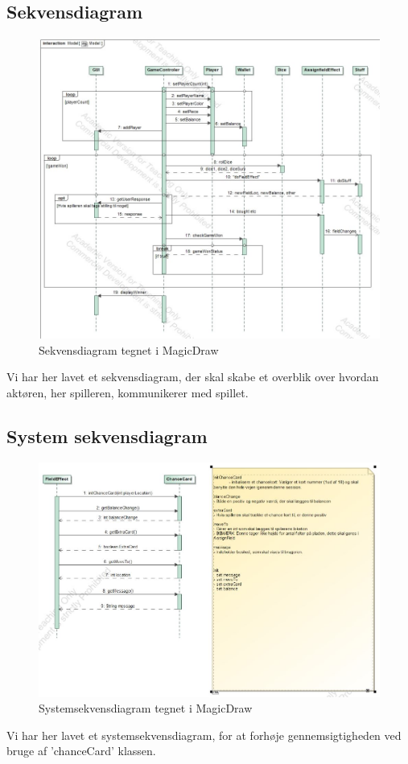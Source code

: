     \subsection{Sekvensdiagram}
        \begin{figure}[h]
            \advance\leftskip-3cm
            \includegraphics[width=18cm]{fig/Sekvensdiagram(1).jpg}
            \caption{Sekvensdiagram tegnet i MagicDraw}
        \end{figure} 
    Vi har her lavet et sekvensdiagram, der skal skabe et overblik over hvordan aktøren, her spilleren,
    kommunikerer med spillet.


    \subsection{System sekvensdiagram}   
        \begin{figure}[h]
            \advance\leftskip-3cm
            \includegraphics[width=20cm]{fig/SSD.jpg}
            \caption{Systemsekvensdiagram tegnet i MagicDraw}
        \end{figure}
    Vi har her lavet et systemsekvensdiagram, for at forhøje gennemsigtigheden ved bruge af
    'chanceCard' klassen.
    
